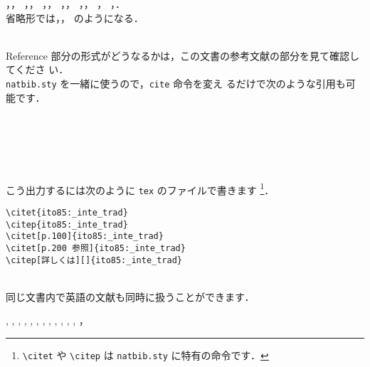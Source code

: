 \documentclass[a4j,10pt]{jarticle}
\begin{document}
\begin{screen}
\citet{miyazawa02:_io_intr}，\citet{isikawa02jp:_env_trade}，
\citet{oyama99:_mark_stru}，\citet{kuroda97jp:keo}，
\citet{kiyono93:_regu_comp_1}，\citet{iwamoto91jp:haito-keika}，
\citet{ito85:_inte_trad}，\citet{nishimura90:_micr_econ}，
\citet*{imai72:_micr_2}，\citet*{imai71:_micr_1}，
\citet{somusho04jp:2000io-kaisetsu}，
\citet{barro97jp}，\citet*{markusen99jp:trade_vol_1}．\\
省略形では，\citet{imai71:_micr_1}，\citet{markusen99jp:trade_vol_1}
のようになる．
\end{screen}
\\

Reference 部分の形式がどうなるかは，この文書の参考文献の部分を見て確認してくださ
い．
\\

\texttt{natbib.sty} を一緒に使うので，\texttt{cite} 命令を変え
るだけで次のような引用も可能です．
\begin{screen}
\hspace*{1cm} \citet{ito85:_inte_trad}\\
\hspace*{1cm} \citep{ito85:_inte_trad}\\
\hspace*{1cm} \citet[p.100]{ito85:_inte_trad}\\
\hspace*{1cm} \citet[p.200 参照]{ito85:_inte_trad}\\
\hspace*{1cm} \citep[詳しくは][]{ito85:_inte_trad}
\end{screen}

こう出力するには次のように \texttt{tex} のファイルで書きます
\footnote{\verb|\citet| や \verb|\citep| は \texttt{natbib.sty} に特有の命令です．}．

\begin{screen}
 \begin{verbatim}
\citet{ito85:_inte_trad}
\citep{ito85:_inte_trad}
\citet[p.100]{ito85:_inte_trad}
\citet[p.200 参照]{ito85:_inte_trad}
\citep[詳しくは][]{ito85:_inte_trad}
 \end{verbatim}
\end{screen}
\\

同じ文書内で英語の文献も同時に扱うことができます．

\begin{screen}
 \citet{ishikawa03:_green_gas_emiss_contr_open_econom},
 \citet{ishikawa94:_revis_stolp_samuel_rybcz_theor_produc_exter},
 \citet{brooke03:_gams},
 \citet{rutherford00:_gtapin_gtap_eg},
 \citet{fujita99jp:_spatial_econom},
 \citet{wong95:_inter_trade_goods_factor_mobil_},
 \citet{brezis93:_leapf_inter_compet},
 \citet{krugman91:_geogr_trade},
 \citet{krugman91:_is_bilat_bad},
 \citet{wang89:_model_therm_hydrod_aspec_molten},
 \citet{lucas76:_econom_polic_evaluat},
 \citet{milne-thomson68:_theor_hydrod},
 \citet{2007yamasue482353}，
 \citet{2009yamasue502165} 
\end{screen}
\end{document}
